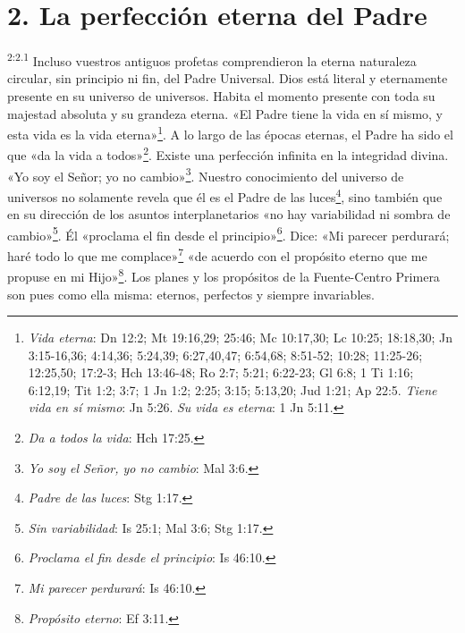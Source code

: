 \section*{2. La perfección eterna del Padre}
\par
\textsuperscript{2:2.1} Incluso vuestros antiguos profetas comprendieron la eterna naturaleza circular, sin principio ni fin, del Padre Universal. Dios está literal y eternamente presente en su universo de universos. Habita el momento presente con toda su majestad absoluta y su grandeza eterna. «El Padre tiene la vida en sí mismo, y esta vida es la vida eterna»\footnote{\textit{Vida eterna}: Dn 12:2; Mt 19:16,29; 25:46; Mc 10:17,30; Lc 10:25; 18:18,30; Jn 3:15-16,36; 4:14,36; 5:24,39; 6:27,40,47; 6:54,68; 8:51-52; 10:28; 11:25-26; 12:25,50; 17:2-3; Hch 13:46-48; Ro 2:7; 5:21; 6:22-23; Gl 6:8; 1 Ti 1:16; 6:12,19; Tit 1:2; 3:7; 1 Jn 1:2; 2:25; 3:15; 5:13,20; Jud 1:21; Ap 22:5. \textit{Tiene vida en sí mismo}: Jn 5:26. \textit{Su vida es eterna}: 1 Jn 5:11.}. A lo largo de las épocas eternas, el Padre ha sido el que «da la vida a todos»\footnote{\textit{Da a todos la vida}: Hch 17:25.}. Existe una perfección infinita en la integridad divina. «Yo soy el Señor; yo no cambio»\footnote{\textit{Yo soy el Señor, yo no cambio}: Mal 3:6.}. Nuestro conocimiento del universo de universos no solamente revela que él es el Padre de las luces\footnote{\textit{Padre de las luces}: Stg 1:17.}, sino también que en su dirección de los asuntos interplanetarios «no hay variabilidad ni sombra de cambio»\footnote{\textit{Sin variabilidad}: Is 25:1; Mal 3:6; Stg 1:17.}. Él «proclama el fin desde el principio»\footnote{\textit{Proclama el fin desde el principio}: Is 46:10.}. Dice: «Mi parecer perdurará; haré todo lo que me complace»\footnote{\textit{Mi parecer perdurará}: Is 46:10.} «de acuerdo con el propósito eterno que me propuse en mi Hijo»\footnote{\textit{Propósito eterno}: Ef 3:11.}. Los planes y los propósitos de la Fuente-Centro Primera son pues como ella misma: eternos, perfectos y siempre invariables.

